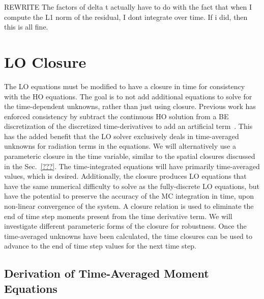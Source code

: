REWRITE The factors of delta t actually have to do with the fact that when I compute the
L1 norm of the residual, I dont integrate over time. If i did, then this is all fine.

\section{LO Closure}

The LO equations must be modified to have a closure in time for consistency with the HO
equations. The goal is to not add additional equations to solve for the
time-dependent unknowns, rather than just using closure.   Previous work has enforced consistency by subtract the continuous HO solution
from a BE discretization of the discretized time-derivatives to add an artificial
term~\cite{holo_rh}.  This has the added benefit that the LO solver exclusively deals in
time-averaged unknowns for radiation terms in the equations.  We will alternatively use a
parameteric closure in the time variable, similar to the spatial closures discussed in the
Sec.~\ref{???}.  The time-integrated equations will have primarily time-averaged
values, which is desired. Additionally, the closure
produces LO equations that have the same numerical difficulty to solve as the fully-discrete LO equations, but
have the potential to preserve the accuracy of the MC integration in time, upon non-linear
convergence of the system.   A closure relation is used to eliminate
the end of time step moments present from the time derivative term.   We will investigate different parameteric forms of the closure for robustness.   Once the time-averaged unknowns have been calculated,
the time closures can be used to advance to the end of time step values for the next
time step.

\subsection{Derivation of Time-Averaged Moment Equations}

